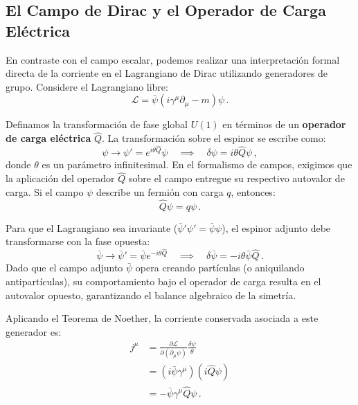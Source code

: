 



\begin{frame}
\section{El Campo de Dirac y el Operador de Carga Eléctrica}

En contraste con el campo escalar, podemos realizar una interpretación formal directa de la corriente en el Lagrangiano de Dirac utilizando generadores de grupo. Considere el Lagrangiano libre:
\begin{equation}
    \mathcal{L} = \bar{\psi}(i\gamma^\mu \partial_\mu - m)\psi \, .
\end{equation}

Definamos la transformación de fase global $U(1)$ en términos de un \textbf{operador de carga eléctrica} $\hat{Q}$. La transformación sobre el espinor se escribe como:
\begin{equation}
    \psi \to \psi' = e^{i\theta \hat{Q}} \psi \quad \implies \quad \delta\psi = i\theta \hat{Q}\psi \, ,
\end{equation}
donde $\theta$ es un parámetro infinitesimal. En el formalismo de campos, exigimos que la aplicación del operador $\hat{Q}$ sobre el campo entregue su respectivo autovalor de carga. Si el campo $\psi$ describe un fermión con carga $q$, entonces:
\begin{equation}
    \hat{Q}\psi = q\psi \, .
\end{equation}

Para que el Lagrangiano sea invariante ($\bar{\psi}'\psi' = \bar{\psi}\psi$), el espinor adjunto debe transformarse con la fase opuesta:
\begin{equation}
    \bar{\psi} \to \bar{\psi}' = \bar{\psi} e^{-i\theta \hat{Q}} \quad \implies \quad \delta\bar{\psi} = -i\theta \bar{\psi} \hat{Q} \, .
\end{equation}
Dado que el campo adjunto $\bar{\psi}$ opera creando partículas (o aniquilando antipartículas), su comportamiento bajo el operador de carga resulta en el autovalor opuesto, garantizando el balance algebraico de la simetría.

Aplicando el Teorema de Noether, la corriente conservada asociada a este generador es:
\begin{align}
    j^\mu &= \frac{\partial \mathcal{L}}{\partial(\partial_\mu \psi)} \frac{\delta\psi}{\theta} \nonumber \\
    &= (i\bar{\psi}\gamma^\mu) (i\hat{Q}\psi) \nonumber \\
    &= -\bar{\psi}\gamma^\mu \hat{Q}\psi \, .
\end{align}


\end{frame}
